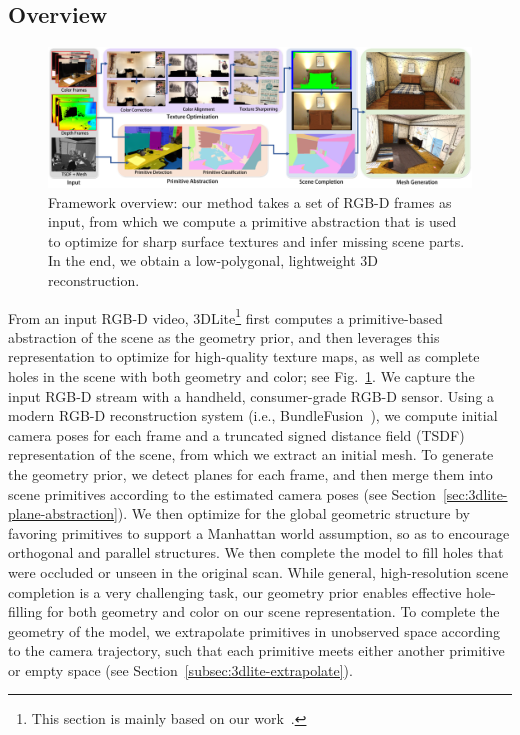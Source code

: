 \subsection{Overview}
\begin{figure}
    \centering
    \includegraphics[width=\textwidth]{3dlite/fig2.png}
    \caption{Framework overview: our method takes a set of RGB-D frames as input, from which we compute a primitive abstraction that is used to optimize for sharp surface textures and infer missing scene parts. In the end, we obtain a low-polygonal, lightweight 3D reconstruction.
    }
    \label{fig:3dlite-overview}
\end{figure}
From an input RGB-D video, 3DLite\footnote{This section is mainly based on our work~\cite{huang20173dlite}.} first computes a primitive-based abstraction of the scene as the geometry prior, and then leverages this representation to optimize for high-quality texture maps, as well as complete holes in the scene with both geometry and color; see Fig.~\ref{fig:3dlite-overview}.
We capture the input RGB-D stream with a handheld, consumer-grade RGB-D sensor.
Using a modern RGB-D reconstruction system (i.e., BundleFusion~\cite{dai2016bundlefusion}), we compute initial camera poses for each frame and a truncated signed distance field (TSDF) representation of the scene, from which we extract an initial mesh.
To generate the geometry prior, we detect planes for each frame, and then merge them into scene primitives according to the estimated camera poses (see Section~\ref{sec:3dlite-plane-abstraction}).
We then optimize for the global geometric structure by favoring primitives to support a Manhattan world assumption, so as to encourage orthogonal and parallel structures. We then complete the model to fill holes that were occluded or unseen in the original scan.
While general, high-resolution scene completion is a very challenging task, our geometry prior enables effective hole-filling for both geometry and color on our scene representation.
To complete the geometry of the model, we extrapolate primitives in unobserved space according to the camera trajectory, such that each primitive meets either another primitive or empty space (see Section~\ref{subsec:3dlite-extrapolate}).

